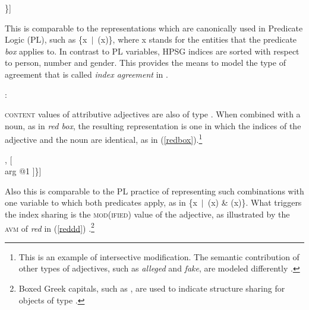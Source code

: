 \documentclass[output=paper
                ,modfonts
                ,nonflat
	        ,collection
	        ,collectionchapter
	        ,collectiontoclongg
 	        ,biblatex
                ,babelshorthands
                ,newtxmath
                ,draftmode
                ,colorlinks, citecolor=brown
]{./langsci/langscibook}
\begin{document}
\begin{exe} 
\ex\label{red} 
\begin{avm}
[\type{scope-object}   \\
 index @1 \type{index} \\
 restr \{[\type{box}   \\
            arg @1 ]\}]
\end{avm} 
\end{exe}

\noindent
This is comparable to the representations which are canonically used in 
Predicate Logic (PL), such as \{x~$|$~(x)\}, where x stands for 
the entities that the predicate \emph{box} applies to. In contrast to 
PL variables, HPSG indices are sorted with respect to person, number 
and gender. This provides the means to model the type of agreement that 
is called \emph{index agreement} in .

\begin{exe} 
\ex  {}: \begin{avm}
                     \end{avm} 
\end{exe} 

\textsc{content} values of attributive adjectives are also of type . 
When combined with a noun, as in \emph{red box}, the resulting representation 
is one in which the indices of the adjective and the noun are identical, as in 
(\ref{redbox}).\footnote{This is an example of intersective modification. 
The semantic contribution of other types of adjectives, such as  
\emph{alleged} and \emph{fake}, are modeled differently \citep[330--331]{ps2}.}   

\begin{exe} 
\ex\label{redbox} 
\begin{avm}
[\type{scope-object}     \\
 index @1                \\
 restr \{ [\type{red}    \\
             arg @1 ] ,
            [  \\
             arg @1 ]\}]
\end{avm}
\end{exe}

\noindent
Also this is comparable to the PL practice of representing such 
combinations with one variable to which both predicates apply, as in 
\{x~$|$~(x) \& (x)\}. What triggers the index sharing is 
the \textsc{mod(ified)} value of the adjective, as illustrated by the \textsc{avm} of 
\emph{red} in (\ref{reddd}) \citep[55]{ps2}.\footnote{Boxed Greek capitals, 
such as \iboxb{$\Sigma$}, are used to indicate structure sharing for objects of 
type  \citep{GS00}.} 
\end{document}
